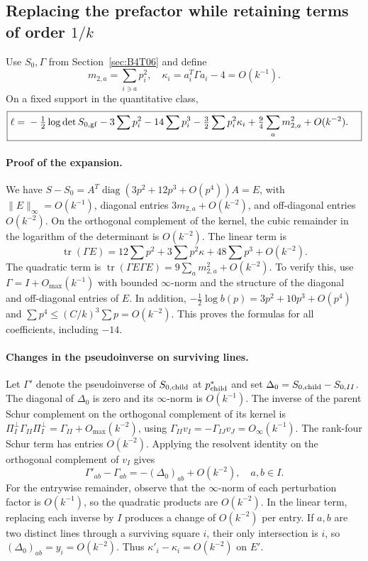 \subsection{Replacing the prefactor while retaining terms of order
\texorpdfstring{$1/k$}{1/k}}\label{sec:B4T07}
Use $S_0,\Gamma$ from Section~\ref{sec:B4T06} and define
\[
 m_{2,a}=\sum_{i\ni a}p_i^2,\quad
 \kappa_i=a_i^T\Gamma a_i-4=O(k^{-1}).
\]
On a fixed support in the quantitative class,
\begin{equation}\label{eq:ell-exp}
 \boxed{\begin{aligned}
 \ell={}&-\tfrac12\log\det S_{0,\rm gf}-3\sum p_i^2-14\sum p_i^3
 -\tfrac32\sum p_i^2\kappa_i
 +\tfrac94\sum_a m_{2,a}^2+O(k^{-2}).
 \end{aligned}}
\end{equation}

\paragraph{Proof of the expansion.}
We have $S-S_0=A^T\operatorname{diag}(3p^2+12p^3+O(p^4))A=E$, with $\|E\|_\infty=O(k^{-1})$, diagonal
entries $3m_{2,a}+O(k^{-2})$, and off-diagonal entries $O(k^{-2})$.
On the orthogonal complement of the kernel, the cubic remainder in the logarithm of the determinant is
$O(k^{-2})$. The linear term is
\[
 \operatorname{tr}(\Gamma E)=12\sum p^2+
 3\sum p^2\kappa+48\sum p^3+O(k^{-2}).
\]
The quadratic term is $\operatorname{tr}(\Gamma E\Gamma E)=9\sum_a m_{2,a}^2+O(k^{-2})$. To verify this, use
$\Gamma=I+O_{\max}(k^{-1})$ with bounded $\infty$-norm and the structure of the diagonal and off-diagonal
entries of $E$. In addition, $-\tfrac12\log b(p)=3p^2+10p^3+O(p^4)$ and $\sum p^4\le(C/k)^3\sum
p=O(k^{-2})$. This proves the formulas for all coefficients, including $-14$.

\paragraph{Changes in the pseudoinverse on surviving lines.}
Let $\Gamma'$ denote the pseudoinverse of $S_{0,\rm child}$ at $p^*_{\rm child}$ and set $\Delta_0=S_{0,\rm
child}-S_{0,II}$.
The diagonal of $\Delta_0$ is zero and its $\infty$-norm is $O(k^{-1})$.
The inverse of the parent Schur complement on the orthogonal complement of its kernel is
$\Pi_I^\perp\Gamma_{II}\Pi_I^\perp=\Gamma_{II}+O_{\max}(k^{-2})$, using
$\Gamma_{II}v_I=-\Gamma_{IJ}v_J=O_\infty(k^{-1})$.
The rank-four Schur term has entries $O(k^{-2})$.
Applying the resolvent identity on the orthogonal complement of $v_I$ gives
\[
 \boxed{\Gamma'_{ab}-\Gamma_{ab}=-(\Delta_0)_{ab}+O(k^{-2}),\quad a,b\in I.}
\]
For the entrywise remainder, observe that the $\infty$-norm of each perturbation factor is $O(k^{-1})$, so
the quadratic products are $O(k^{-2})$.
In the linear term, replacing each inverse by $I$ produces a change of $O(k^{-2})$ per entry.
If $a,b$ are two distinct lines through a surviving square $i$, their only intersection is $i$, so
$(\Delta_0)_{ab}=y_i=O(k^{-2})$.
Thus $\kappa'_i-\kappa_i=O(k^{-2})$ on $E'$.

